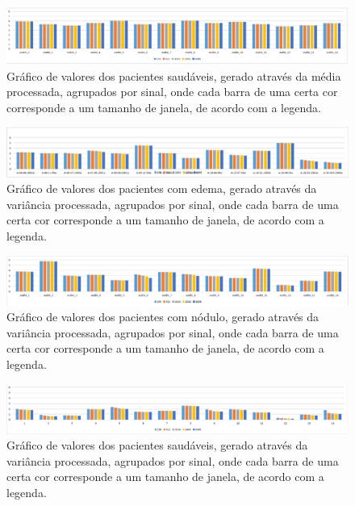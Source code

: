 \documentclass[a4paper,12pt,oneside]{report}
\begin{document}
\begin{figure}[H]
\includegraphics[width=1\textwidth, height=0.15\paperheight]{media_normal}
	\caption{Gr\'{a}fico de valores dos pacientes saud\'{a}veis, gerado atrav\'{e}s da m\'{e}\-dia pro\-ces\-sa\-da, agrupados por sinal, onde cada barra de uma certa cor corresponde a um tamanho de janela, de acordo com a legenda.}
	\label{fig:media_normal}
\end{figure}
\begin{figure}[H]
\includegraphics[width=1\textwidth, height=0.15\paperheight]{variancia_edema}
	\caption{Gr\'{a}fico de valores dos pacientes com edema, gerado atrav\'{e}s da va\-ri\-\^{a}n\-ci\-a processada, agrupados por sinal, onde cada barra de uma certa cor corresponde a um tamanho de janela, de acordo com a legenda.}
	\label{fig:variancia_edema}
\end{figure}
\begin{figure}
\includegraphics [width=1\textwidth, height=0.15\paperheight]{variancia_nodulo}
	\caption{Gr\'{a}fico de valores dos pacientes com n\'{o}dulo, gerado atrav\'{e}s da vari\^{a}ncia processada, agrupados por sinal, onde cada barra de uma certa cor corresponde a um tamanho de janela, de acordo com a legenda.}
	\label{fig:variancia_nodulo}
\end{figure}
\begin{figure}
\includegraphics[width=1\textwidth, height=0.15\paperheight]{variancia_normal}
	\caption{Gr\'{a}fico de valores dos pacientes saud\'{a}veis, gerado atrav\'{e}s da va\-ri\-\^{a}n\-ci\-a processada, agrupados por sinal, onde cada barra de uma certa cor corresponde a um tamanho de janela, de acordo com a legenda.}	
	\label{fig:variancia_normal}
\end{figure}
\end{document}
